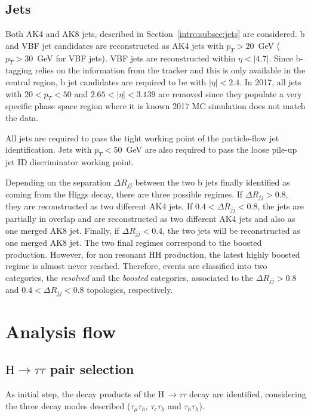 \documentclass[../main.tex]{subfiles}
\begin{document}
\subsection{Jets}
\label{hh:subsec:jets}

Both AK4 and AK8 jets, described in Section~\ref{intro:subsec:jets} are considered. b and VBF jet candidates are reconstructed as AK4 jets with $p_T>20$~GeV ($p_T>30$~GeV for VBF jets). VBF jets are reconstructed within $\eta<|4.7|$. Since b-tagging relies on the information from the tracker and this is only available in the central region, b jet candidates are required to be with $|\eta|<2.4$. In 2017, all jets with $20<p_T<50$ and $2.65<|\eta|<3.139$ are removed since they populate a very specific phase space region where it is known 2017 MC simulation does not match the data.

All jets are required to pass the tight working point of the particle-flow jet identification. Jets with $p_T<50$~GeV are also required to pass the loose pile-up jet ID discriminator working point.

Depending on the separation $\Delta R_{jj}$ between the two b jets finally identified as coming from the Higgs decay, there are three possible regimes. If $\Delta R_{jj} > 0.8$, they are reconstructed as two different AK4 jets. If $0.4 < \Delta R_{jj} < 0.8$, the jets are partially in overlap and are reconstructed as two different AK4 jets and also as one merged AK8 jet. Finally, if $\Delta R_{jj} < 0.4$, the two jets will be reconstructed as one merged AK8 jet. The two final regimes correspond to the boosted production. However, for non resonant HH production, the latest highly boosted regime is almost never reached. Therefore, events are classified into two categories, the \textit{resolved} and the \textit{boosted} categories, associated to the $\Delta R_{jj} > 0.8$ and $0.4 < \Delta R_{jj} < 0.8$ topologies, respectively.



\section{Analysis flow}
\label{hh:sec:analysis_flow}

\subsection{$\text{H}\to\tau\tau$ pair selection}
\label{hh:subsec:htt_pair_selection}

As initial step, the decay products of the H$~\to\tau\tau$ decay are identified, considering the three decay modes described ($\tau_\mu\tau_h$, $\tau_e\tau_h$ and $\tau_h\tau_h$). 
\end{document}
